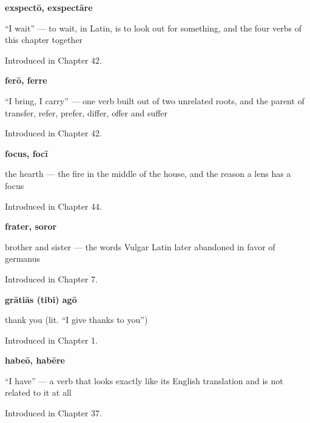 \noindent\begin{minipage}[t]{\linewidth}
\raggedright
\textbf{exspectō, exspectāre}\par
\small \textquotedblleft{}I wait\textquotedblright{} — to wait, in Latin, is to look out for something, and the four verbs of this chapter together\par
\footnotesize Introduced in Chapter 42.
\end{minipage}\par\medskip

\noindent\begin{minipage}[t]{\linewidth}
\raggedright
\textbf{ferō, ferre}\par
\small \textquotedblleft{}I bring, I carry\textquotedblright{} — one verb built out of two unrelated roots, and the parent of transfer, refer, prefer, differ, offer and suffer\par
\footnotesize Introduced in Chapter 42.
\end{minipage}\par\medskip

\noindent\begin{minipage}[t]{\linewidth}
\raggedright
\textbf{focus, focī}\par
\small the hearth — the fire in the middle of the house, and the reason a lens has a focus\par
\footnotesize Introduced in Chapter 44.
\end{minipage}\par\medskip

\noindent\begin{minipage}[t]{\linewidth}
\raggedright
\textbf{frater, soror}\par
\small brother and sister — the words Vulgar Latin later abandoned in favor of germanus\par
\footnotesize Introduced in Chapter 7.
\end{minipage}\par\medskip

\noindent\begin{minipage}[t]{\linewidth}
\raggedright
\textbf{grātiās (tibi) agō}\par
\small thank you (lit. \textquotedblleft{}I give thanks to you\textquotedblright{})\par
\footnotesize Introduced in Chapter 1.
\end{minipage}\par\medskip

\noindent\begin{minipage}[t]{\linewidth}
\raggedright
\textbf{habeō, habēre}\par
\small \textquotedblleft{}I have\textquotedblright{} — a verb that looks exactly like its English translation and is not related to it at all\par
\footnotesize Introduced in Chapter 37.
\end{minipage}\par\medskip

